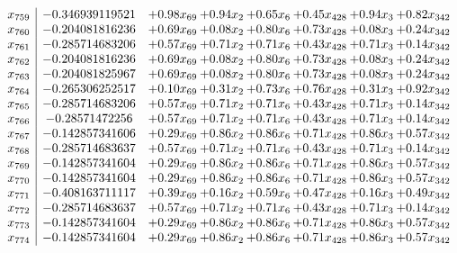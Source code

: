 \documentclass[8pt]{article}
\begin{document}
\[\begin{array}{c| c c@{\hskip 2pt} c@{\hskip 2pt} c@{\hskip 2pt} c@{\hskip 2pt} c@{\hskip 2pt} c@{\hskip 2pt} }
 x_{759}   &  -0.346939119521 & +  0.98 x_{69} & +  0.94 x_{2} & +  0.65 x_{6} & +  0.45 x_{428} & +  0.94 x_{3} & +  0.82 x_{342}\\
 x_{760}   &  -0.204081816236 & +  0.69 x_{69} & +  0.08 x_{2} & +  0.80 x_{6} & +  0.73 x_{428} & +  0.08 x_{3} & +  0.24 x_{342}\\
 x_{761}   &  -0.285714683206 & +  0.57 x_{69} & +  0.71 x_{2} & +  0.71 x_{6} & +  0.43 x_{428} & +  0.71 x_{3} & +  0.14 x_{342}\\
 x_{762}   &  -0.204081816236 & +  0.69 x_{69} & +  0.08 x_{2} & +  0.80 x_{6} & +  0.73 x_{428} & +  0.08 x_{3} & +  0.24 x_{342}\\
 x_{763}   &  -0.204081825967 & +  0.69 x_{69} & +  0.08 x_{2} & +  0.80 x_{6} & +  0.73 x_{428} & +  0.08 x_{3} & +  0.24 x_{342}\\
 x_{764}   &  -0.265306252517 & +  0.10 x_{69} & +  0.31 x_{2} & +  0.73 x_{6} & +  0.76 x_{428} & +  0.31 x_{3} & +  0.92 x_{342}\\
 x_{765}   &  -0.285714683206 & +  0.57 x_{69} & +  0.71 x_{2} & +  0.71 x_{6} & +  0.43 x_{428} & +  0.71 x_{3} & +  0.14 x_{342}\\
 x_{766}   &  -0.28571472256 & +  0.57 x_{69} & +  0.71 x_{2} & +  0.71 x_{6} & +  0.43 x_{428} & +  0.71 x_{3} & +  0.14 x_{342}\\
 x_{767}   &  -0.142857341606 & +  0.29 x_{69} & +  0.86 x_{2} & +  0.86 x_{6} & +  0.71 x_{428} & +  0.86 x_{3} & +  0.57 x_{342}\\
 x_{768}   &  -0.285714683637 & +  0.57 x_{69} & +  0.71 x_{2} & +  0.71 x_{6} & +  0.43 x_{428} & +  0.71 x_{3} & +  0.14 x_{342}\\
 x_{769}   &  -0.142857341604 & +  0.29 x_{69} & +  0.86 x_{2} & +  0.86 x_{6} & +  0.71 x_{428} & +  0.86 x_{3} & +  0.57 x_{342}\\
 x_{770}   &  -0.142857341604 & +  0.29 x_{69} & +  0.86 x_{2} & +  0.86 x_{6} & +  0.71 x_{428} & +  0.86 x_{3} & +  0.57 x_{342}\\
 x_{771}   &  -0.408163711117 & +  0.39 x_{69} & +  0.16 x_{2} & +  0.59 x_{6} & +  0.47 x_{428} & +  0.16 x_{3} & +  0.49 x_{342}\\
 x_{772}   &  -0.285714683637 & +  0.57 x_{69} & +  0.71 x_{2} & +  0.71 x_{6} & +  0.43 x_{428} & +  0.71 x_{3} & +  0.14 x_{342}\\
 x_{773}   &  -0.142857341604 & +  0.29 x_{69} & +  0.86 x_{2} & +  0.86 x_{6} & +  0.71 x_{428} & +  0.86 x_{3} & +  0.57 x_{342}\\
 x_{774}   &  -0.142857341604 & +  0.29 x_{69} & +  0.86 x_{2} & +  0.86 x_{6} & +  0.71 x_{428} & +  0.86 x_{3} & +  0.57 x_{342}\\

\end{array}\]
\end{document}
